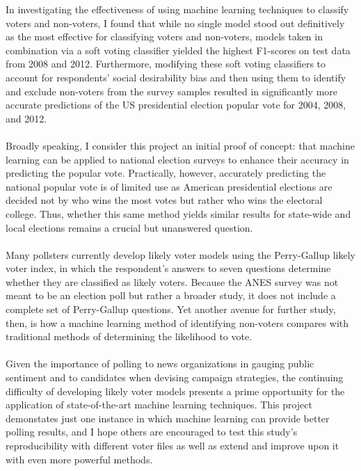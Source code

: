 \documentclass{article}
\begin{document}
	In investigating the effectiveness of using machine learning techniques to classify voters and non-voters, I found that while no single model stood out definitively as the most effective for classifying voters and non-voters, models taken in combination via a soft voting classifier yielded the highest F1-scores on test data from 2008 and 2012. Furthermore, modifying these soft voting classifiers to account for respondents' social desirability bias and then using them to identify and exclude non-voters from the survey samples resulted in significantly more accurate predictions of the US presidential election popular vote for 2004, 2008, and 2012.
	\\\\
	Broadly speaking, I consider this project an initial proof of concept: that machine learning can be applied to national election surveys to enhance their accuracy in predicting the popular vote. Practically, however, accurately predicting the national popular vote is of limited use as American presidential elections are decided not by who wins the most votes but rather who wins the electoral college. Thus, whether this same method yields similar results for state-wide and local elections remains a crucial but unanswered question.
	\\\\
	Many pollsters currently develop likely voter models using the Perry-Gallup likely voter index, in which the respondent's answers to seven questions determine whether they are classified as likely voters. Because the ANES survey was not meant to be an election poll but rather a broader study, it does not include a complete set of Perry-Gallup questions. Yet another avenue for further study, then, is how a machine learning method of identifying non-voters compares with traditional methods of determining the likelihood to vote.
	\\\\
	Given the importance of polling to news organizations in gauging public sentiment and to candidates when devising campaign strategies, the continuing difficulty of developing likely voter models presents a prime opportunity for the application of state-of-the-art machine learning techniques. This project demonstates just one instance in which machine learning can provide better polling results, and I hope others are encouraged to test this study's reproducibility with different voter files as well as extend and improve upon it with even more powerful methods.
	
\end{document}
